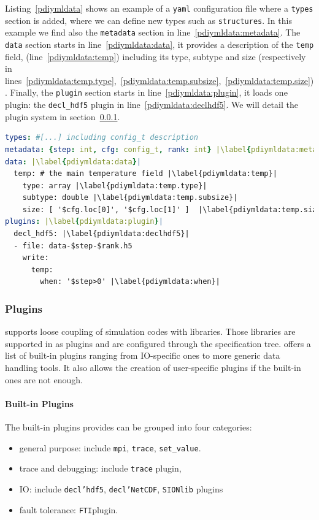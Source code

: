 Listing~\ref{pdiymldata} shows an example of a \pdi \texttt{yaml} configuration file where a \texttt{types} section is added, where we can define new types such as \texttt{structures}. In this example we find also the \texttt{metadata} section in line~\ref{pdiymldata:metadata}. The \texttt{data} section starts in line~\ref{pdiymldata:data}, it provides a description of the \texttt{temp} field, (line~\ref{pdiymldata:temp}) including its type, subtype and size (respectively in lines~\ref{pdiymldata:temp.type},~\ref{pdiymldata:temp.subsize},~\ref{pdiymldata:temp.size}). 
Finally, the \texttt{plugin} section starts in line~\ref{pdiymldata:plugin}, it loads one plugin: the \texttt{decl\_hdf5} plugin in line~\ref{pdiymldata:declhdf5}. We will detail the \pdi plugin system in section~\ref{plugins}.

\begin{lstlisting}[float, label=pdiymldata, language=yaml, caption=Data description in \pdi YAML file]
types: #[...] including config_t description
metadata: {step: int, cfg: config_t, rank: int} |\label{pdiymldata:metadata}|
data: |\label{pdiymldata:data}|
  temp: # the main temperature field |\label{pdiymldata:temp}|
    type: array |\label{pdiymldata:temp.type}|
    subtype: double |\label{pdiymldata:temp.subsize}|
    size: [ '$cfg.loc[0]', '$cfg.loc[1]' ]  |\label{pdiymldata:temp.size}|
plugins: |\label{pdiymldata:plugin}|
  decl_hdf5: |\label{pdiymldata:declhdf5}|
  - file: data-$step-$rank.h5 
    write:
      temp:
        when: '$step>0' |\label{pdiymldata:when}|
\end{lstlisting}

\subsubsection{\pdi Plugins}\label{plugins}
\pdi supports loose coupling of simulation codes with libraries. Those libraries are supported in \pdi as plugins and are configured through the specification tree. \pdi offers a list of built-in plugins ranging from IO-specific ones to more generic data handling tools. It also allows the creation of user-specific plugins if the built-in ones are not enough.     

\paragraph{Built-in Plugins}
The built-in plugins \pdi provides can be grouped into four categories: 
\begin{itemize}
    \item general purpose: include \texttt{mpi}, \texttt{trace}, \texttt{set\_value}.  
    \item trace and debugging: include \texttt{trace} plugin,
    \item IO: include \texttt{decl’hdf5}, \texttt{decl’NetCDF}, \texttt{SIONlib} plugins
    \item fault tolerance: \texttt{FTI}plugin.
\end{itemize}

